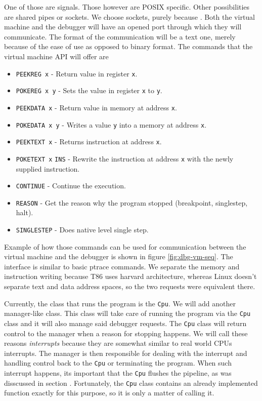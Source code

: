 One of those are signals. Those however are POSIX specific. Other possibilities
are shared pipes or sockets. We choose sockets, purely because . Both the virtual machine and the debugger
will have an opened port through which they will communicate. The format
of the communication will be a text one, merely because of the ease of use
as opposed to binary format. The commands that the virtual machine API
will offer are
\begin{itemize}
    \item \texttt{PEEKREG x} - Return value in register \texttt{x}.
    \item \texttt{POKEREG x y} - Sets the value in register \texttt{x} to
        \texttt{y}.
    \item \texttt{PEEKDATA x} - Return value in memory at address \texttt{x}.
    \item \texttt{POKEDATA x y} - Writes a value \texttt{y} into a memory at
        address \texttt{x}.
    \item \texttt{PEEKTEXT x} - Returns instruction at address \texttt{x}.
    \item \texttt{POKETEXT x} \texttt{INS} - Rewrite the instruction at
        address
        \texttt{x} with the newly supplied instruction.
    \item \texttt{CONTINUE} - Continue the execution.
    \item \texttt{REASON} - Get the reason why the program stopped (breakpoint,
        singlestep, halt).
    \item \texttt{SINGLESTEP} - Does native level single step.
\end{itemize}
Example of how those commands can be used for communication between the virtual
machine and the debugger is shown in figure \ref{fig:dbg-vm-seq}. The interface
is similar to basic ptrace commands. We separate the memory and instruction
writing because T86 uses harvard architecture, whereas Linux doesn't separate
text and data address spaces\cite{ptrace}, so the two requests were equivalent
there.

Currently, the class that runs the program is the \texttt{Cpu}. We will add
another manager-like class. This class will take care of running the program
via the \texttt{Cpu} class and it will also manage said debugger requests. The
\texttt{Cpu} class will return control to the manager when a reason for
stopping happens. We will call these reasons \textit{interrupts} because they
are somewhat similar to real world CPUs interrupts. The manager is then
responsible for dealing with the interrupt and handling control back to the
\texttt{Cpu} or terminating the program. When such interrupt happens, its
important that the \texttt{Cpu} flushes the pipeline, as was disscussed in
section . Fortunately, the \texttt{Cpu} class contains an already
implemented function exactly for this purpose, so it is only a matter of
calling it.

